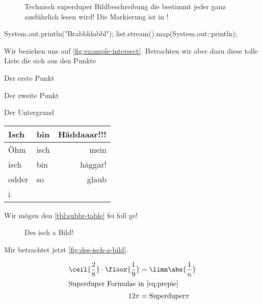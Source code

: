 \documentclass[userip]{lecture-digital}
\begin{document}
\Blindtext[1]
\begin{figure}
    \centering{}
    \caption{Technisch superduper Bildbeschreibung die bestimmt jeder ganz ausführlich lesen wird! Die Markierung ist in \tikzAname!}
    \label{fig:example-intersect}
\end{figure}
\Blindtext[2]
\begin{java*}
System.out.println("Brabbldabbl");
list.stream().map(System.out::println);
\end{java*}
Wir beziehen uns auf \autoref{fig:example-intersect}. Betrachten wir aber dazu diese tolle Liste die sich aus den Punkte \begin{inlist}
    \item Der erste Punkt 
    \item Der zweite Punkt
    \item Der Untergrund
\end{inlist}
\Blindtext[2]
\begin{table}
    \centering%
    \label{tbl:subbr-table}
    \begin{tabular}{llr}
        \toprule
            Isch & bin & Häddaaar!!! \\
        \midrule
            Öhm & isch & mein \\
            isch & bin & häggar!\\
            odder & so & glaub \\
            i \\
        \bottomrule
    \end{tabular}
\end{table}
Wir mögen den \autoref{tbl:subbr-table} fei foll ge!
\Blindtext[1]
\begin{figure*}
    \centering{}
    \caption[Des isch a breites Bild!]{Des isch a Bild!}
    \label{fig:des-isch-a-bild}
\end{figure*}
Mir betrachtet jetzt \autoref{fig:des-isch-a-bild}.
\Blindtext[1]
\begin{wide}
    \begin{align}
        \ceil{\frac{2}{8}} \cdot \floor{\frac{1}{9}}& = \limn\abs{\frac{1}{n}} \label{eq:prepie}\\
        \intertext{Superduper Formulae in \autoref{eq:prepie}}
        12 \pi &= \text{Superduper}\pi
    \end{align}
\end{wide}
\Blindtext[8]
\end{document}
